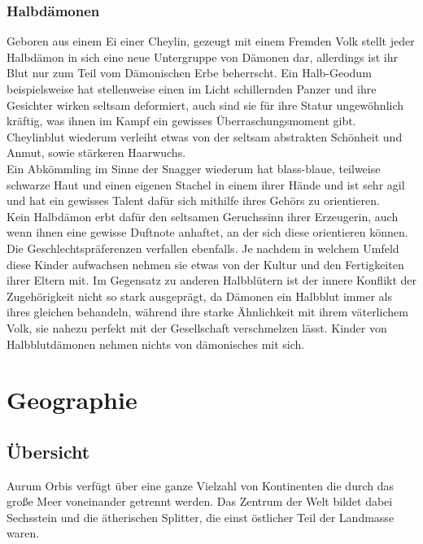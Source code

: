 \documentclass[a4paper,12pt,oneside]{book}
\begin{document}
\section{Halbdämonen}
Geboren aus einem Ei einer Cheylin, gezeugt mit einem Fremden Volk stellt jeder Halbdämon in sich eine neue Untergruppe von Dämonen dar, allerdings ist ihr Blut nur zum Teil vom Dämonischen Erbe beherrscht.
Ein Halb-Geodum beispielsweise hat stellenweise einen im Licht schillernden Panzer und ihre Gesichter wirken seltsam deformiert, auch sind sie für ihre Statur ungewöhnlich kräftig, was ihnen im Kampf ein gewisses Überraschungsmoment gibt. 
\\Cheylinblut wiederum verleiht etwas von der seltsam abstrakten Schönheit und Anmut, sowie stärkeren Haarwuchs.
\\Ein Abkömmling im Sinne der Snagger wiederum hat blass-blaue, teilweise schwarze Haut und einen eigenen Stachel in einem ihrer Hände und ist sehr agil und hat ein gewisses Talent dafür sich mithilfe ihres Gehörs zu orientieren.
\\Kein Halbdämon erbt dafür den seltsamen Geruchssinn ihrer Erzeugerin, auch wenn ihnen eine gewisse Duftnote anhaftet, an der sich diese orientieren können. Die Geschlechtspräferenzen verfallen ebenfalls. Je nachdem in welchem Umfeld diese Kinder aufwachsen nehmen sie etwas von der Kultur und den Fertigkeiten ihrer Eltern mit. Im Gegensatz zu anderen Halbblütern ist der innere Konflikt der Zugehörigkeit nicht so stark ausgeprägt, da Dämonen ein Halbblut immer als ihres gleichen behandeln, während ihre starke Ähnlichkeit mit ihrem väterlichem Volk, sie nahezu perfekt mit der Gesellschaft verschmelzen lässt. Kinder von Halbblutdämonen nehmen nichts von dämonisches mit sich.

\part{Geographie}
\setcounter{chapter}{0}
\chapter{Übersicht}
Aurum Orbis verfügt über eine ganze Vielzahl von Kontinenten die durch das große Meer voneinander getrennt werden. Das Zentrum der Welt bildet dabei Sechsstein und die ätherischen Splitter, die einst östlicher Teil der Landmasse waren.
\end{document}
